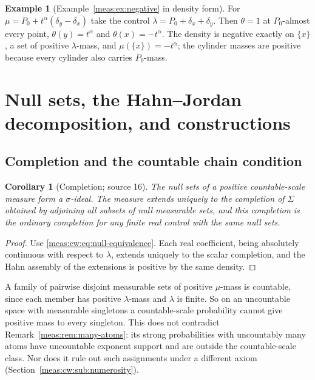 \documentclass[11pt]{article}
\numberwithin{equation}{section}
\newtheorem{corollary}[theorem]{Corollary}
\theoremstyle{definition}
\newtheorem{example}[theorem]{Example}
\theoremstyle{remark}
\begin{document}
\begin{example}[Example~\ref{meas:ex:negative} in density form]
\label{meas:cw:ex:negative-density}
For $\mu=P_0+t^\alpha(\delta_y-\delta_x)$ take the control
$\lambda=P_0+\delta_x+\delta_y$. Then $\theta=1$ at $P_0$-almost every point,
$\theta(y)=t^\alpha$ and $\theta(x)=-t^\alpha$. The density is negative exactly on
$\{x\}$, a set of positive $\lambda$-mass, and $\mu(\{x\})=-t^\alpha$; the
cylinder masses are positive because every cylinder also carries $P_0$-mass.
\end{example}

\section{Null sets, the Hahn--Jordan decomposition, and constructions}
\label{meas:cw:sec:jordan}

\subsection{Completion and the countable chain condition}

\begin{corollary}[Completion; source 16]\label{meas:cw:cor:completion}
The null sets of a positive countable-scale measure form a $\sigma$-ideal. The
measure extends uniquely to the completion of $\Sigma$ obtained by adjoining all
subsets of null measurable sets, and this completion is the ordinary completion
for any finite real control with the same null sets.
\end{corollary}
\begin{proof}
Use \eqref{meas:cw:eq:null-equivalence}. Each real coefficient, being
absolutely continuous with respect to $\lambda$, extends uniquely to the scalar
completion, and the Hahn assembly of the extensions is positive by the same
density.
\end{proof}

A family of pairwise disjoint measurable sets of positive $\mu$-mass is
countable, since each member has positive $\lambda$-mass and $\lambda$ is finite. So
on an uncountable space with measurable singletons a countable-scale
probability cannot give positive mass to every singleton. This does not
contradict Remark~\ref{meas:rem:many-atoms}: its strong probabilities with
uncountably many atoms have uncountable exponent support and are outside the
countable-scale class. Nor does it rule out such assignments under a different
axiom (Section~\ref{meas:cw:sub:numerosity}).
\end{document}
